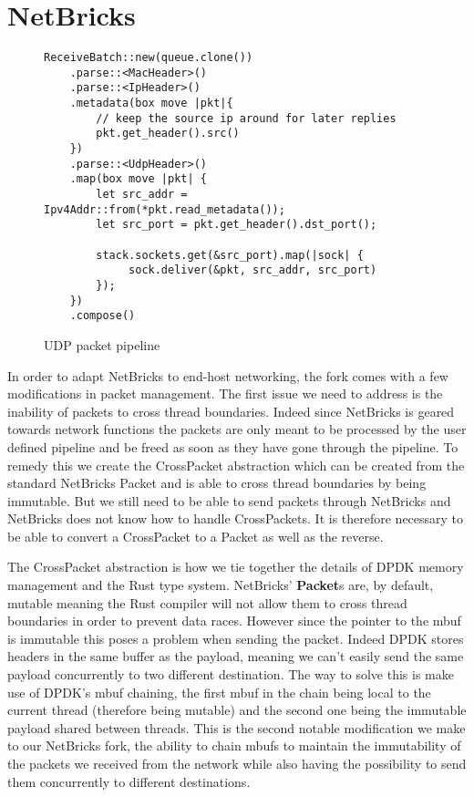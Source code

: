 \section{NetBricks} \label{sec:netbricks}

\begin{figure}[htb!]
\begin{lstlisting}
ReceiveBatch::new(queue.clone())
    .parse::<MacHeader>()
    .parse::<IpHeader>()
    .metadata(box move |pkt|{
        // keep the source ip around for later replies
        pkt.get_header().src()
    })
    .parse::<UdpHeader>()
    .map(box move |pkt| {
        let src_addr = Ipv4Addr::from(*pkt.read_metadata());
        let src_port = pkt.get_header().dst_port();

        stack.sockets.get(&src_port).map(|sock| {
             sock.deliver(&pkt, src_addr, src_port)
        });
    })
    .compose()
\end{lstlisting}

  \label{code:udp-pipeline}
  \caption{UDP packet pipeline}
\end{figure}

In order to adapt NetBricks to end-host networking, the fork comes
with a few modifications in packet management. The first issue we need
to address is the inability of packets to cross thread
boundaries. Indeed since NetBricks is geared towards network functions
the packets are only meant to be processed by the user defined
pipeline and be freed as soon as they have gone through the
pipeline. To remedy this we create the CrossPacket abstraction which
can be created from the standard NetBricks Packet and is able to cross
thread boundaries by being immutable. But we still need to be able to
send packets through NetBricks and NetBricks does not know how to
handle CrossPackets. It is therefore necessary to be able to convert a
CrossPacket to a Packet as well as the reverse.



The CrossPacket abstraction is how we tie together the details of DPDK
memory management and the Rust type system. NetBricks'
\textbf{Packet}s are, by default, mutable meaning the Rust compiler
will not allow them to cross thread boundaries in order to prevent
data races. However since the pointer to the mbuf is immutable this
poses a problem when sending the packet. Indeed DPDK stores headers in
the same buffer as the payload, meaning we can't easily send the same
payload concurrently to two different destination. The way to solve
this is make use of DPDK's mbuf chaining, the first mbuf in the chain
being local to the current thread (therefore being mutable) and the
second one being the immutable payload shared between threads. This is
the second notable modification we make to our NetBricks fork, the
ability to chain mbufs to maintain the immutability of the packets we
received from the network while also having the possibility to send
them concurrently to different destinations.

